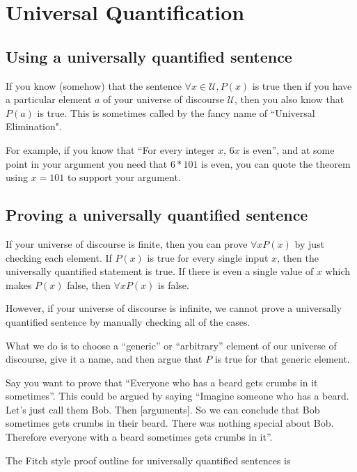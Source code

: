 \newpage

\section{Universal Quantification}

\subsection{Using a universally quantified sentence}

If you know (somehow) that the sentence $\forall x \in \mathcal{U}, P(x)$ is true then if you have a particular element $a$ of your universe of discourse $\mathcal{U}$, then you also know that $P(a)$ is true.  This is sometimes called by the fancy name of ``Universal Elimination".

For example, if you know that ``For every integer $x$, $6x$ is even'', and at some point in your argument you need that $6*101$ is even, you can  quote the theorem using $x = 101$ to support your argument.

\subsection{Proving a universally quantified sentence}

If your universe of discourse is finite, then you can prove $\forall x P(x)$ by just checking each element.  If $P(x)$ is true for every single input $x$, then the universally quantified statement is true.  If there is even a single value of $x$ which makes $P(x)$ false, then $\forall x P(x)$ is false.

However, if your universe of discourse is infinite, we cannot prove a universally quantified sentence by manually checking all of the cases.  

What we do is to choose a ``generic'' or ``arbitrary'' element of our universe of discourse, give it a name, and then argue that $P$ is true for that generic element.

Say you want to prove that ``Everyone who has a beard gets crumbs in it sometimes''.  This could be argued by saying ``Imagine someone who has a beard. Let's just call them Bob.  Then [arguments].  So we can conclude that Bob sometimes gets crumbs in their beard.  There was nothing special about Bob.  Therefore everyone with a beard sometimes gets crumbs in it''.

The Fitch style proof outline for universally quantified sentences is 

